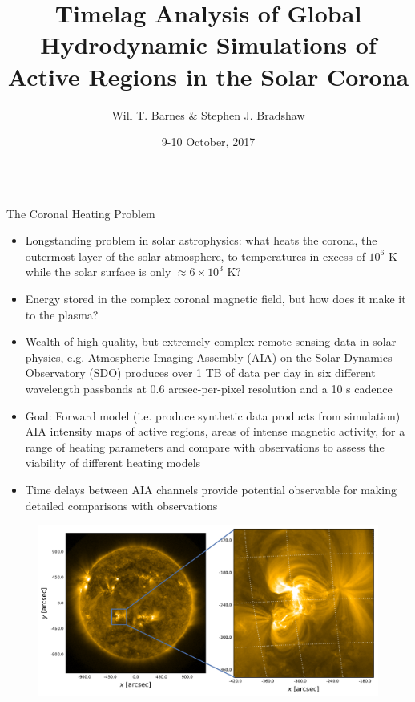 \documentclass[final]{beamer}
\title[AR Timelag Analysis]{Timelag Analysis of Global Hydrodynamic Simulations of Active Regions in the Solar Corona}
\author[Barnes \& Bradshaw]{Will T. Barnes \& Stephen J. Bradshaw}
\institute[Rice University]{Department of Physics and Astronomy, Rice University\\
                            Rice Data Science Conference, 9-10 October 2017}
\date{9-10 October, 2017}
\begin{document}
\begin{frame}
  \begin{columns}[T]
  \hfill
  \begin{column}{0.49\linewidth}
    \begin{block}{The Coronal Heating Problem}
        \begin{itemize}
            \item Longstanding problem in solar astrophysics: \alert{what heats the corona, the outermost layer of the solar atmosphere, to temperatures in excess of $10^6$ K while the solar surface is only $\approx6\times10^3$ K?}
            \item Energy stored in the complex coronal magnetic field, but how does it make it to the plasma?
            \item Wealth of high-quality, but extremely complex remote-sensing data in solar physics, e.g. Atmospheric Imaging Assembly (AIA) on the Solar Dynamics Observatory (SDO) produces over 1 TB of data per day in six different wavelength passbands at 0.6 arcsec-per-pixel resolution and a 10 s cadence \citep{lemen_atmospheric_2012}
            \item \alert{Goal:} Forward model (i.e. produce synthetic data products from simulation) AIA intensity maps of active regions, areas of intense magnetic activity, for a range of heating parameters and compare with observations to assess the viability of different heating models
            \item Time delays between AIA channels provide potential \alert{observable} for making detailed comparisons with observations
        \end{itemize}
        \begin{figure}
            \centering
            \begin{columns}
                \includegraphics[width=\columnwidth]{figures/fulldisk_plus_zoom_171.pdf}

\end{columns}
\end{figure}
\end{block}
\end{column}
\end{columns}
\end{frame}
\end{document}
